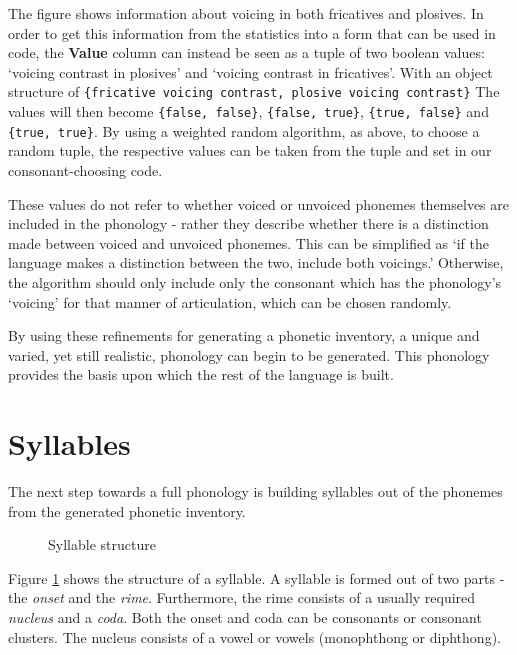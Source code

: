 \documentclass{report}
\begin{document}
	The figure shows information about voicing in both fricatives and plosives. In order to get this information from the statistics into a form that can be used in code, the \textbf{Value} column can instead be seen as a tuple of two boolean values: `voicing contrast in plosives' and `voicing contrast in fricatives'. With an object structure of \verb|{fricative voicing contrast, plosive voicing contrast}| The values will then become \verb|{false, false}|, \verb|{false, true}|, \verb|{true, false}| and \verb|{true, true}|. By using a weighted random algorithm, as above, to choose a random tuple, the respective values can be taken from the tuple and set in our consonant-choosing code.
	
	These values do not refer to whether voiced or unvoiced phonemes themselves are included in the phonology - rather they describe whether there is a distinction made between voiced and unvoiced phonemes. This can be simplified as `if the language makes a distinction between the two, include both voicings.' Otherwise, the algorithm should only include only the consonant which has the phonology's `voicing' for that manner of articulation, which can be chosen randomly.
	
	By using these refinements for generating a phonetic inventory, a unique and varied, yet still realistic, phonology can begin to be generated. This phonology provides the basis upon which the rest of the language is built.

	\section{Syllables}
	
	The next step towards a full phonology is building syllables out of the phonemes from the generated phonetic inventory.
	
	\begin{figure}[h]
		\caption{Syllable structure}
		\label{syllable structure}
		\centering
	\end{figure}

	Figure \ref{syllable structure} shows the structure of a syllable. A syllable is formed out of two parts - the \textit{onset} and the \textit{rime}. Furthermore, the rime consists of a usually required \textit{nucleus} and a \textit{coda}. Both the onset and coda can be consonants or consonant clusters. The nucleus consists of a vowel or vowels (monophthong or diphthong).
	
\end{document}
